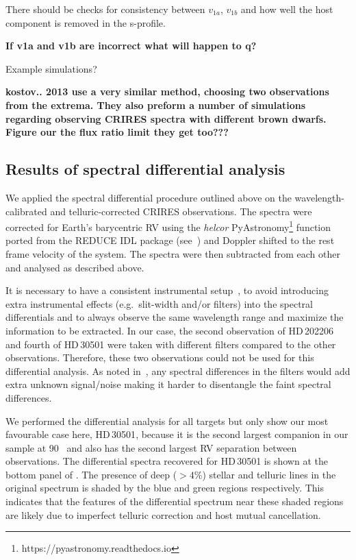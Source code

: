 There should be checks for consistency between \(v_{1a}\), \(v_{1b}\) and how well the host component is removed in the s-profile.

\textbf{If v1a and v1b are incorrect what will happen to q?}



Example simulations?

\textbf{kostov.. 2013 use a very similar method, choosing two observations from the extrema. They also preform a number of simulations regarding observing CRIRES spectra with different brown dwarfs. Figure our the flux ratio limit they get too???}

\subsection{Results of spectral differential analysis}
\label{subsec:differential_results}

We applied the spectral differential procedure outlined above on the wavelength-calibrated and telluric-corrected {CRIRES} observations. The spectra were corrected for Earth's barycentric {RV} using the \emph{helcor} PyAstronomy\footnote{https://pyastronomy.readthedocs.io} function ported from the REDUCE IDL package (see~\citet[][]{piskunov_new_2002}) and Doppler shifted to the rest frame velocity of the system. The spectra were then subtracted from each other and analysed as described above.

It is necessary to have a consistent instrumental setup~\citet{ferluga_separating_1997}, to avoid introducing extra instrumental effects (e.g.\ slit-width and/or filters) into the spectral differentials and to always observe the same wavelength range and maximize the information to be extracted. In our case, the second observation of {HD\,202206} and fourth of {HD\,30501} were taken with different filters compared to the other observations. Therefore, these two observations could not be used for this differential analysis. As noted in~\citep{hadrava_disentangling_2009}, any spectral differences in the filters would add extra unknown signal/noise making it harder to disentangle the faint spectral differences.


We performed the differential analysis for all targets but only show our most favourable case here, {HD\,30501}, because it is the second largest companion in our sample at 90~\Mjup{} and also has the second largest {RV} separation between observations. The differential spectra recovered for {HD\,30501} is shown at the bottom panel of . The presence of deep (\(>4\%\)) stellar and telluric lines in the original spectrum is shaded by the blue and green regions respectively. This indicates that the features of the differential spectrum near these shaded regions are likely due to imperfect telluric correction and host mutual cancellation.

